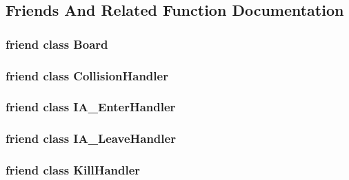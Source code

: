 \subsection{Friends And Related Function Documentation}
\hypertarget{class_game_a12525b6ed7c8186be0bee5cf78e2a49c}{
\subsubsection[{Board}]{\setlength{\rightskip}{0pt plus 5cm}friend class {\bf Board}\hspace{0.3cm}{\ttfamily [friend]}}}\label{class_game_a12525b6ed7c8186be0bee5cf78e2a49c}
\hypertarget{class_game_ab0955901615f29e137d1ad6b95fc2c55}{
\subsubsection[{Collision\-Handler}]{\setlength{\rightskip}{0pt plus 5cm}friend class Collision\-Handler\hspace{0.3cm}{\ttfamily [friend]}}}\label{class_game_ab0955901615f29e137d1ad6b95fc2c55}
\hypertarget{class_game_ad46435fe6b8e9a384d33d608058862ae}{
\subsubsection[{I\-A\-\_\-\-Enter\-Handler}]{\setlength{\rightskip}{0pt plus 5cm}friend class {\bf I\-A\-\_\-\-Enter\-Handler}\hspace{0.3cm}{\ttfamily [friend]}}}\label{class_game_ad46435fe6b8e9a384d33d608058862ae}
\hypertarget{class_game_adc4c20007ad2fd4bc2556fbfbff54945}{
\subsubsection[{I\-A\-\_\-\-Leave\-Handler}]{\setlength{\rightskip}{0pt plus 5cm}friend class {\bf I\-A\-\_\-\-Leave\-Handler}\hspace{0.3cm}{\ttfamily [friend]}}}\label{class_game_adc4c20007ad2fd4bc2556fbfbff54945}
\hypertarget{class_game_aab5a016b7fd0a16c4e689d3102ec3a17}{
\subsubsection[{Kill\-Handler}]{\setlength{\rightskip}{0pt plus 5cm}friend class {\bf Kill\-Handler}\hspace{0.3cm}{\ttfamily [friend]}}}\label{class_game_aab5a016b7fd0a16c4e689d3102ec3a17}


